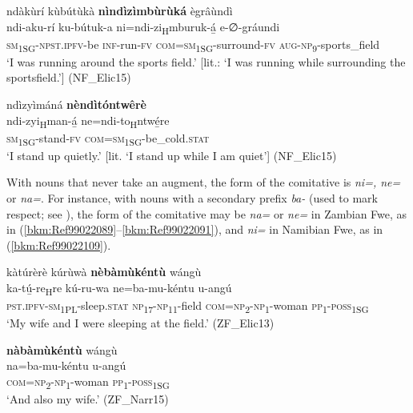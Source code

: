 \ea
\label{bkm:Ref476926486}
ndàkùrí kùbútùkà \textbf{nìndìzìmbùrùká} ègrâùndì\\
\gll ndi-aku-rí    ku-bútuk-a  ni=ndi-zi\textsubscript{H}mburuk-á̲     e-∅-gráundi \\
\textsc{sm}\textsubscript{1SG}-\textsc{npst}.\textsc{ipfv}-be  \textsc{inf}-run-\textsc{fv}
\textsc{com}=\textsc{sm}\textsubscript{1SG}-surround-\textsc{fv}  \textsc{aug}-\textsc{np}\textsubscript{9}-sports\_field\\
\glt ‘I was running around the sports field.’ [lit.: ‘I was running while surrounding the sportsfield.’] (NF\_Elic15)
\z

\ea
\label{bkm:Ref476926495}
ndìzyìmáná \textbf{nèndìtóntwêrè}\\
\gll ndi-zyi\textsubscript{H}man-á̲  ne=ndi-to\textsubscript{H}ntwé̲re\\
\textsc{sm}\textsubscript{1SG}-stand-\textsc{fv}  \textsc{com}=\textsc{sm}\textsubscript{1SG}-be\_cold.\textsc{stat}\\
\glt ‘I stand up quietly.’ [lit. ‘I stand up while I am quiet’] (NF\_Elic15)
\z

With nouns that never take an augment, the form of the comitative is \textit{ni=, ne=} or \textit{na=}. For instance, with nouns with a secondary prefix \textit{ba-} (used to mark respect; see ), the form of the comitative may be \textit{na=} or \textit{ne=} in Zambian Fwe, as in (\ref{bkm:Ref99022089}--\ref{bkm:Ref99022091}), and \textit{ni=} in Namibian Fwe, as in (\ref{bkm:Ref99022109}).

\ea
\label{bkm:Ref99022089}
kàtúrèrè kúrùwà \textbf{nèbàmùkéntù} wángù\\
\gll ka-tú̲-re\textsubscript{H}re      kú-ru-wa ne=ba-mu-kéntu    u-angú \\
\textsc{pst}.\textsc{ipfv}-\textsc{sm}\textsubscript{1PL}-sleep.\textsc{stat}  \textsc{np}\textsubscript{17}-\textsc{np}\textsubscript{11}-field
\textsc{com}=\textsc{np}\textsubscript{2}-\textsc{np}\textsubscript{1}-woman  \textsc{pp}\textsubscript{1}-\textsc{poss}\textsubscript{1SG}\\
\glt ‘My wife and I were sleeping at the field.’ (ZF\_Elic13)
\z

\ea
\label{bkm:Ref99022091}
\textbf{nàbàmùkéntù} wángù\\
\gll na=ba-mu-kéntu    u-angú\\
\textsc{com}=\textsc{np}\textsubscript{2}-\textsc{np}\textsubscript{1}-woman  \textsc{pp}\textsubscript{1}-\textsc{poss}\textsubscript{1SG}\\
\glt ‘And also my wife.’ (ZF\_Narr15)
\z

